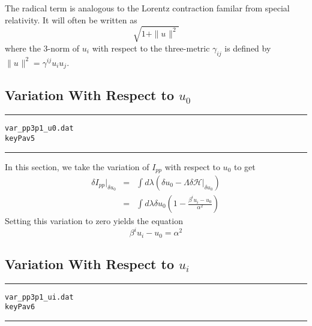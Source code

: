 \documentclass[12pt]{article}
\begin{document}
The radical term is analogous to the Lorentz contraction familar from
special relativity. It will often be written as
\begin{equation}\label{Pav4_4}
\sqrt{ 1 + \| {u}_{} \| ^ 2 }
\end{equation}
where the 3-norm of $ {u}_{i} $ with respect to the three-metric
$ {\gamma}_{i j} $ is defined by $ \| {u}_{} \| ^2 = {\gamma}^{i j}
{u}_{i} {u}_{j} $.
\subsection{Variation With Respect to $ u_0 $}

\clearpage
\vspace{5mm}
\hrule
\begin{alltt}
  var_pp3p1_u0.dat
  key Pav5
\end{alltt}
\hrule
\vspace{5mm}

In this section, we take the variation of $ I_{pp} $ with respect to
$ {u}_{0} $ to get
\begin{eqnarray}\label{Pav5_1}
{ \delta I_{pp} } |_{\delta {u}_{0} } & = & \int d \lambda \left( \delta {u}_{0}
- \Lambda { \delta \mathcal{H} } |_{\delta {u}_{0} } \right) \nonumber \\
& = & \int d \lambda \delta {u}_{0} \left( 1 -
\frac{ {\beta}^{i} {u}_{i} - {u}_{0} }
{ \alpha ^2 } \right)
\end{eqnarray}
Setting this variation to zero yields the equation
\begin{equation}\label{Pav5_2}
{\beta}^{i} {u}_{i} - {u}_{0} = \alpha ^2
\end{equation}
\subsection{Variation With Respect to $ u_i $}

\clearpage
\vspace{5mm}
\hrule
\begin{alltt}
  var_pp3p1_ui.dat
  key Pav6
\end{alltt}
\hrule
\vspace{5mm}
\end{document}
